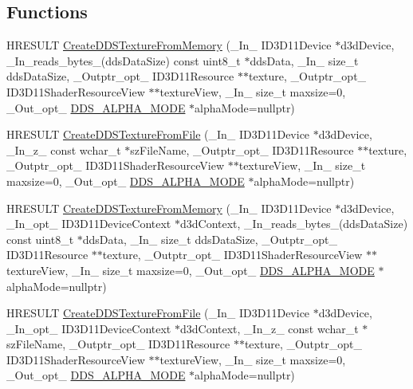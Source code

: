 \subsection*{Functions}
\begin{DoxyCompactItemize}
\item 
H\+R\+E\+S\+U\+LT \mbox{\hyperlink{namespace_direct_x_a62a12ff7a57a36483e157b1fb1fe8dff}{Create\+D\+D\+S\+Texture\+From\+Memory}} (\+\_\+\+In\+\_\+ I\+D3\+D11\+Device $\ast$d3d\+Device, \+\_\+\+In\+\_\+reads\+\_\+bytes\+\_\+(dds\+Data\+Size) const uint8\+\_\+t $\ast$dds\+Data, \+\_\+\+In\+\_\+ size\+\_\+t dds\+Data\+Size, \+\_\+\+Outptr\+\_\+opt\+\_\+ I\+D3\+D11\+Resource $\ast$$\ast$texture, \+\_\+\+Outptr\+\_\+opt\+\_\+ I\+D3\+D11\+Shader\+Resource\+View $\ast$$\ast$texture\+View, \+\_\+\+In\+\_\+ size\+\_\+t maxsize=0, \+\_\+\+Out\+\_\+opt\+\_\+ \mbox{\hyperlink{namespace_direct_x_a7cb48689d75471680c0bf7f79caaaf1f}{D\+D\+S\+\_\+\+A\+L\+P\+H\+A\+\_\+\+M\+O\+DE}} $\ast$alpha\+Mode=nullptr)
\item 
H\+R\+E\+S\+U\+LT \mbox{\hyperlink{namespace_direct_x_a72103949d0a30b4d1cf2c68fb4d0ec19}{Create\+D\+D\+S\+Texture\+From\+File}} (\+\_\+\+In\+\_\+ I\+D3\+D11\+Device $\ast$d3d\+Device, \+\_\+\+In\+\_\+z\+\_\+ const wchar\+\_\+t $\ast$sz\+File\+Name, \+\_\+\+Outptr\+\_\+opt\+\_\+ I\+D3\+D11\+Resource $\ast$$\ast$texture, \+\_\+\+Outptr\+\_\+opt\+\_\+ I\+D3\+D11\+Shader\+Resource\+View $\ast$$\ast$texture\+View, \+\_\+\+In\+\_\+ size\+\_\+t maxsize=0, \+\_\+\+Out\+\_\+opt\+\_\+ \mbox{\hyperlink{namespace_direct_x_a7cb48689d75471680c0bf7f79caaaf1f}{D\+D\+S\+\_\+\+A\+L\+P\+H\+A\+\_\+\+M\+O\+DE}} $\ast$alpha\+Mode=nullptr)
\item 
H\+R\+E\+S\+U\+LT \mbox{\hyperlink{namespace_direct_x_a597be68a8cd5caf647a21e3d54230a91}{Create\+D\+D\+S\+Texture\+From\+Memory}} (\+\_\+\+In\+\_\+ I\+D3\+D11\+Device $\ast$d3d\+Device, \+\_\+\+In\+\_\+opt\+\_\+ I\+D3\+D11\+Device\+Context $\ast$d3d\+Context, \+\_\+\+In\+\_\+reads\+\_\+bytes\+\_\+(dds\+Data\+Size) const uint8\+\_\+t $\ast$dds\+Data, \+\_\+\+In\+\_\+ size\+\_\+t dds\+Data\+Size, \+\_\+\+Outptr\+\_\+opt\+\_\+ I\+D3\+D11\+Resource $\ast$$\ast$texture, \+\_\+\+Outptr\+\_\+opt\+\_\+ I\+D3\+D11\+Shader\+Resource\+View $\ast$$\ast$texture\+View, \+\_\+\+In\+\_\+ size\+\_\+t maxsize=0, \+\_\+\+Out\+\_\+opt\+\_\+ \mbox{\hyperlink{namespace_direct_x_a7cb48689d75471680c0bf7f79caaaf1f}{D\+D\+S\+\_\+\+A\+L\+P\+H\+A\+\_\+\+M\+O\+DE}} $\ast$alpha\+Mode=nullptr)
\item 
H\+R\+E\+S\+U\+LT \mbox{\hyperlink{namespace_direct_x_af625c91d9244b4829f140665e00acc57}{Create\+D\+D\+S\+Texture\+From\+File}} (\+\_\+\+In\+\_\+ I\+D3\+D11\+Device $\ast$d3d\+Device, \+\_\+\+In\+\_\+opt\+\_\+ I\+D3\+D11\+Device\+Context $\ast$d3d\+Context, \+\_\+\+In\+\_\+z\+\_\+ const wchar\+\_\+t $\ast$sz\+File\+Name, \+\_\+\+Outptr\+\_\+opt\+\_\+ I\+D3\+D11\+Resource $\ast$$\ast$texture, \+\_\+\+Outptr\+\_\+opt\+\_\+ I\+D3\+D11\+Shader\+Resource\+View $\ast$$\ast$texture\+View, \+\_\+\+In\+\_\+ size\+\_\+t maxsize=0, \+\_\+\+Out\+\_\+opt\+\_\+ \mbox{\hyperlink{namespace_direct_x_a7cb48689d75471680c0bf7f79caaaf1f}{D\+D\+S\+\_\+\+A\+L\+P\+H\+A\+\_\+\+M\+O\+DE}} $\ast$alpha\+Mode=nullptr)

\end{DoxyCompactItemize}

